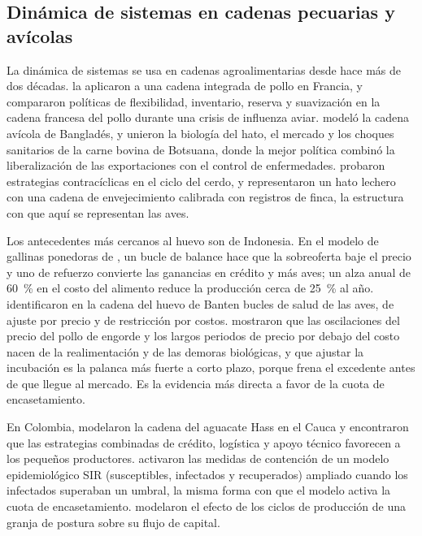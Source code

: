 \documentclass[preprint,12pt,authoryear]{elsarticle}
\begin{document}
\subsection{Dinámica de sistemas en cadenas pecuarias y avícolas}
\label{sec2.4}

La dinámica de sistemas se usa en cadenas agroalimentarias desde hace más de dos décadas. \citet{MinegishiThiel2000} la aplicaron a una cadena integrada de pollo en Francia, y \citet{VoThiel2011} compararon políticas de flexibilidad, inventario, reserva y suavización en la cadena francesa del pollo durante una crisis de influenza aviar. \citet{Shamsuddoha2014} modeló la cadena avícola de Bangladés, y \citet{Dizyee2017} unieron la biología del hato, el mercado y los choques sanitarios de la carne bovina de Botsuana, donde la mejor política combinó la liberalización de las exportaciones con el control de enfermedades. \citet{Lu2020} probaron estrategias contracíclicas en el ciclo del cerdo, y \citet{Atzori2023} representaron un hato lechero con una cadena de envejecimiento calibrada con registros de finca, la estructura con que aquí se representan las aves.

Los antecedentes más cercanos al huevo son de Indonesia. En el modelo de gallinas ponedoras de \citet{Yuzaria2025}, un bucle de balance hace que la sobreoferta baje el precio y uno de refuerzo convierte las ganancias en crédito y más aves; un alza anual de 60~\% en el costo del alimento reduce la producción cerca de 25~\% al año. \citet{Saepullah2025} identificaron en la cadena del huevo de Banten bucles de salud de las aves, de ajuste por precio y de restricción por costos. \citet{Haryana2026} mostraron que las oscilaciones del precio del pollo de engorde y los largos periodos de precio por debajo del costo nacen de la realimentación y de las demoras biológicas, y que ajustar la incubación es la palanca más fuerte a corto plazo, porque frena el excedente antes de que llegue al mercado. Es la evidencia más directa a favor de la cuota de encasetamiento.

En Colombia, \citet{AnaconaMopan2023} modelaron la cadena del aguacate Hass en el Cauca y encontraron que las estrategias combinadas de crédito, logística y apoyo técnico favorecen a los pequeños productores. \citet{RubianoIbarraVega2021} activaron las medidas de contención de un modelo epidemiológico SIR (susceptibles, infectados y recuperados) ampliado cuando los infectados superaban un umbral, la misma forma con que el modelo activa la cuota de encasetamiento. \citet{ParraOrtega2025} modelaron el efecto de los ciclos de producción de una granja de postura sobre su flujo de capital.
\end{document}
